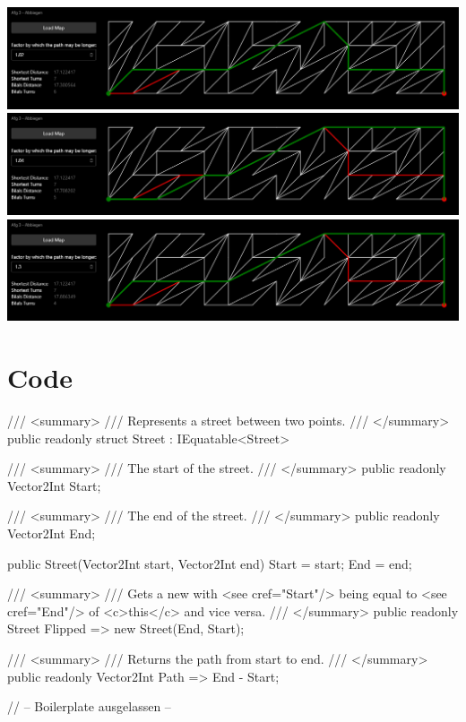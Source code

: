 \documentclass{article}
\begin{document}
\begin{center}
\includegraphics[width=\textwidth]{examples/3_02.png}
\includegraphics[width=\textwidth]{examples/3_04.png}
\includegraphics[width=\textwidth]{examples/3_30.png}
\end{center}

\section{Code}

\begin{lstcs}[]
/// <summary>
/// Represents a street between two points.
/// </summary>
public readonly struct Street : IEquatable<Street>
{
    /// <summary>
    /// The start of the street.
    /// </summary>
    public readonly Vector2Int Start;

    /// <summary>
    /// The end of the street.
    /// </summary>
    public readonly Vector2Int End;

    public Street(Vector2Int start, Vector2Int end)
    {
        Start = start;
        End = end;
    }

    /// <summary>
    /// Gets a new with <see cref="Start"/> being equal to <see cref="End"/> of <c>this</c> and vice versa.
    /// </summary>
    public readonly Street Flipped => new Street(End, Start);

    /// <summary>
    /// Returns the path from start to end.
    /// </summary>
    public readonly Vector2Int Path => End - Start;

    // -- Boilerplate ausgelassen --
}
\end{lstcs}
\end{document}

